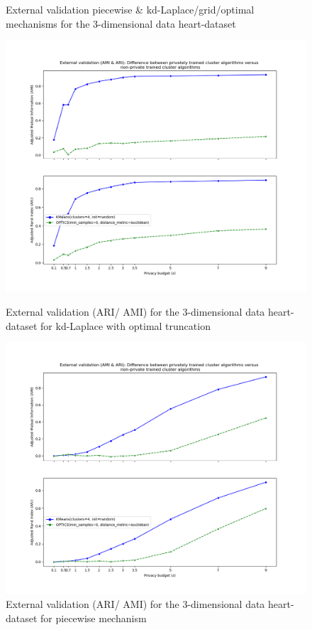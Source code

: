 \begin{figure}[H]
    \caption{External validation piecewise \& kd-Laplace/grid/optimal mechanisms for the 3-dimensional data heart-dataset}
    \centering
    \begin{minipage}[c]{0.60\textwidth}
        \includegraphics[width=1\textwidth]{Results/3d-laplace-optimal-truncated/heart-dataset/ami-and-ari.png}
        \caption{External validation (ARI/ AMI) for the 3-dimensional data heart-dataset for kd-Laplace with optimal truncation}
        \label{fig:external-validation-heart-dataset_comparison_3d-laplace}
    \end{minipage}
    \begin{minipage}[c]{0.60\textwidth}
        \includegraphics[width=1\textwidth]{Results/3d-piecewise/heart-dataset/ami-and-ari.png}
        \caption{External validation (ARI/ AMI) for the 3-dimensional data heart-dataset for piecewise mechanism}
        \label{fig:external-validation-heart-dataset_comparison_3d-piecewise}
    \end{minipage}
\end{figure}
